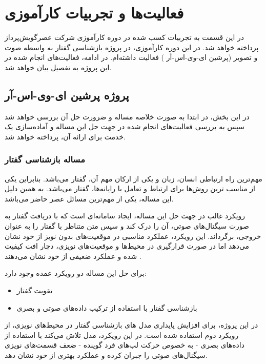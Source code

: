 \chapter{فعالیت‌ها و تجربیات کارآموزی}

در این قسمت به تجربیات کسب شده در دوره کارآموزی شرکت عصر‌گویش‌پرداز پرداخته خواهد شد. در این دوره کارآموزی، در پروژه بازشناسی گفتار به واسطه صوت و تصویر (پرشین ای-وی-اس-آر
) فعالیت داشته‌ام. در ادامه، فعالیت‌های انجام شده در این پروژه به تفصیل بیان خواهد شد.

\section{پروژه پرشین ای-وی-اس-آر}

در این بخش، در ابتدا به صورت خلاصه مساله و ضرورت حل آن بررسی خواهد شد سپس به بررسی فعالیت‌های انجام شده در جهت حل این مساله و آماده‌سازی یک خدمت
برای ارائه آن، پرداخته خواهد شد.

\subsection{مساله بازشناسی گفتار}

مهم‌ترین راه ارتباطی انسان، زبان و یکی از ارکان مهم آن، گفتار می‌باشد. بنابراین یکی از مناسب ترین روش‌ها برای ارتباط و تعامل با رایانه‌ها، گفتار می‌باشد. به همین دلیل این مساله، یکی از مهم‌ترین مسائل عصر حاضر می‌باشد. 

رویکرد غالب در جهت حل این مساله، ایجاد سامانه‌ای است که با دریافت گفتار به صورت سیگنال‌های صوتی، آن را درک کند و سپس متن متناظر با گفتار را به عنوان خروجی، برگرداند. این رویکرد، عملکرد مناسبی در موقعیت‌های بدون نویز از خود نشان می‌دهد اما در صورت قرارگیری در محیط‌ها و موقعیت‌های نویزی، دچار افت کیفیت شده و عملکرد ضعیفی از خود نشان می‌دهند
\cite{shi2022learning}
.

برای حل این مساله دو رویکرد عمده وجود دارد:
\begin{itemize}
	\item تقویت گفتار
	\item بازشناسی گفتار با استفاده از ترکیب داده‌های صوتی و بصری
\end{itemize}

در این پروژه، برای افزایش پایداری
مدل های بازشناسی گفتار در محیط‌های نویزی، از رویکرد دوم استفاده شده است. در این رویکرد، مدل تلاش می‌کند با استفاده از داده‌های بصری - به خصوص حرکت لب‌های فرد گوینده - ضعف قسمت‌های نویزی سیگنال‌های صوتی را جبران کرده و عملکرد بهتری از خود نشان دهد.

